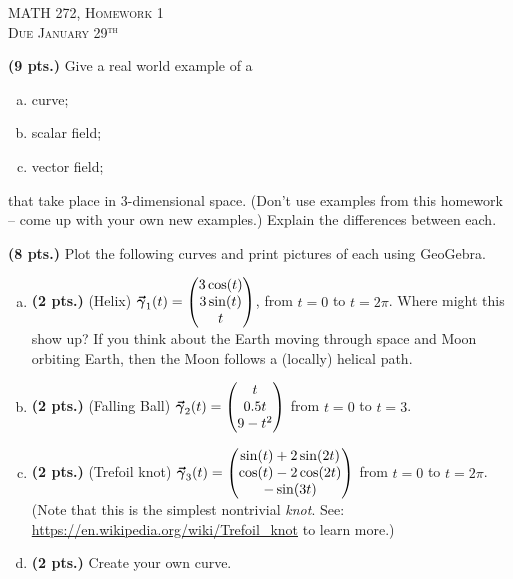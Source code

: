 \documentclass[12pt]{article} %
\begin{document}
\begin{center}
   \textsc{\large MATH 272, Homework 1}\\
   \textsc{Due January 29$^\textrm{th}$}
\end{center}
\vspace{.5cm}

\begin{problem}
\textbf{(9 pts.)} Give a real world example of a
\begin{enumerate}[(a)]
    \item curve;
    \item scalar field;
    \item vector field;
\end{enumerate}
that take place in 3-dimensional space. (Don't use examples from this homework -- come up with your own new examples.) Explain the differences between each.
\end{problem}

\vspace*{0.5cm}

\begin{problem}
\textbf{(8 pts.)} Plot the following curves and print pictures of each using GeoGebra.
\begin{enumerate}[(a)]
	\item \textbf{(2 pts.)} (Helix) $\boldsymbol{\vec{\gamma}}_1(t) = \begin{pmatrix} 3\cos(t) \\ 3\sin(t) \\ t\end{pmatrix}$, from $t=0$ to $t=2\pi$. Where might this show up? If you think about the Earth moving through space and Moon orbiting Earth, then the Moon follows a (locally) helical path.

	\item \textbf{(2 pts.)} (Falling Ball) $\boldsymbol{\vec{\gamma}}_2(t) = \begin{pmatrix} t\\  0.5t \\ 9-t^2 \end{pmatrix}$ from $t=0$ to $t=3$.

	\item \textbf{(2 pts.)} (Trefoil knot) $\boldsymbol{\vec{\gamma}}_3(t) = \begin{pmatrix} \sin(t)+2\sin(2t) \\ \cos(t)-2\cos(2t) \\ -\sin(3t) \end{pmatrix}$ from $t=0$ to $t=2\pi$. (Note that this is the simplest nontrivial \emph{knot}. See: \url{https://en.wikipedia.org/wiki/Trefoil_knot} to learn more.)

	\item \textbf{(2 pts.)} Create your own curve.
\end{enumerate}
\end{problem}
\end{document}
